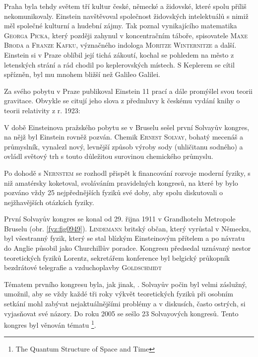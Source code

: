         Praha byla tehdy světem tří kultur české, německé a židovské, které spolu příliš
        nekomunikovaly. Einstein navštěvoval společnost židovských intelektuálů s nimiž měl společné
        kulturní a hudební zájmy. Tak poznal vynikajícího matematika \textsc{Georga Picka}, který
        později zahynul v koncentračním táboře, spisovatele \textsc{Maxe Broda} a \textsc{Franze
        Kafku}, význačného indologa \textsc{Moritze Winternitze} a další. Einstein si v Praze
        oblíbil její tichá zákoutí, kochal se pohledem na město z letenských strání a rád chodil po
        keplerovských místech. S Keplerem se cítil spřízněn, byl mu mnohem bližší než Galileo
        Galilei.

        Za svého pobytu v Praze publikoval Einstein 11 prací a dále promýšlel svou teorii gravitace.
        Obvykle se citují jeho slova z předmluvy k českému vydání knihy o teorii relativity z r.
        1923: \emph{}

        V době Einsteinova pražského pobytu se v Bruselu sešel první Solvayův kongres, na nějž byl
        Einstein rovněž pozván. Chemik \textsc{Ernest Solvay}, bohatý mecenáš a průmyslník, vynalezl
        nový, levnější způsob výroby sody (uhličitanu sodného) a ovládl světový trh s touto
        důležitou surovinou chemického průmyslu. 

        Po dohodě s \textsc{Nernstem} se rozhodl přispět k financování rozvoje moderní fyziky, s niž
        amatérsky koketoval, svoláváním pravidelných kongresů, na které by bylo pozváno vždy 25
        nejpřednějších fyziků své doby, aby spolu diskutovali o nejžhavějších otázkách fyziky.

        První Solvayův kongres se konal od 29. řijna 1911 v Grandhotelu Metropole Bruselu (obr.
        \ref{fyz:fig0949}). \textsc{Lindemann} britský občan, který vyrůstal v Německu, byl
        všestranný fyzik, který se stal blízkým Einsteinovým přítelem a po návratu do Anglie působil
        jako Churchillův poradce. Kongresu předsedal uznávaný nestor teoretických fyziků Lorentz,
        sekretářem konference byl belgický průkopník bezdrátové telegrafie a vzduchoplavby
        \textsc{Goldschmidt}

        Tématem prvního kongresu byla, jak jinak, \emph{}. Solvayův počin
        byl velmi záslužný, umožnil, aby se vždy každé tři roky výkvět teoretických fyziků při
        osobním setkání mohl zabývat nejaktuálnějšími problémy a v diskusích, často ostrých, si
        vyjasňovat své názory. Do roku 2005 se sešlo 23 Solvayových kongresů. Tento kongres byl
        věnován tématu \emph{}\footnote{The Quantum Structure of
        Space and Time}.

